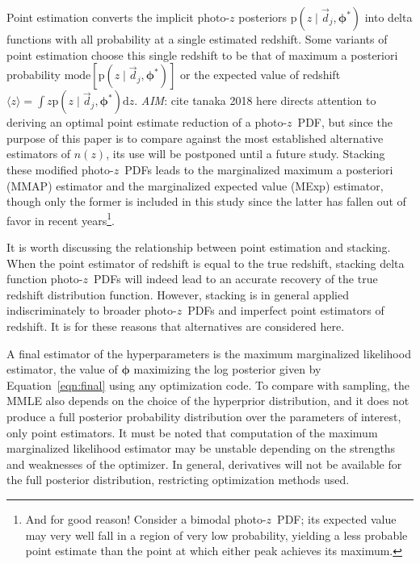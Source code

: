 \documentclass[iop]{emulateapj}
\newcommand{\todo}[3]{{\color{#2}\emph{#1}: #3}}
\newcommand{\aim}[1]{\todo{AIM}{red}{#1}}
\newcommand{\Eq}[1]{Equation~\ref{#1}}
\newcommand{\nz}{$n(z)$}
\newcommand{\data}{\ensuremath{\vec{d}}}
\newcommand{\pr}[1]{\ensuremath{\mathrm{p}(#1)}}
\newcommand{\gvn}{\mid}%
\newcommand{\integral}[2]{\ensuremath{\int #1 \mathrm{d} #2}}
\newcommand{\pz}{photo-$z$~}
\newcommand{\pzpdf}{\pz PDF}
\newcommand{\bvec}[1]{\ensuremath{\boldsymbol{#1}}}
\newcommand{\ndphi}{\bvec{\phi}}
\begin{document}
Point estimation converts the implicit photo-$z$ posteriors $\pr{z \gvn \data_{j}, \ndphi^{*}}$ into delta functions with all probability at a single estimated redshift.  
Some variants of point estimation choose this single redshift to be that of maximum a posteriori probability $\mathrm{mode}[\pr{z \gvn \data_{j}, \ndphi^{*}}]$ or the expected value of redshift $\langle z \rangle = \integral{z \pr{z \gvn \data_{j}, \ndphi^{*}}}{z}$.
\aim{cite tanaka 2018 here} directs attention to deriving an optimal point estimate reduction of a \pzpdf, but since the purpose of this paper is to compare against the most established alternative estimators of \nz, its use will be postponed until a future study.
Stacking these modified \pzpdf s leads to the marginalized maximum a posteriori (MMAP) estimator and the marginalized expected value (MExp) estimator, though only the former is included in this study since the latter has fallen out of favor in recent years\footnote{And for good reason!  Consider a bimodal \pzpdf; its expected value may very well fall in a region of very low probability, yielding a less probable point estimate than the point at which either peak achieves its maximum.}.

It is worth discussing the relationship between point estimation and stacking.  
When the point estimator of redshift is equal to the true redshift, stacking delta function \pzpdf s will indeed lead to an accurate recovery of the true redshift distribution function.  
However, stacking is in general applied indiscriminately to broader \pzpdf s and imperfect point estimators of redshift.  
It is for these reasons that alternatives are considered here.

A final estimator of the hyperparameters is the maximum marginalized likelihood estimator, the value of $\ndphi$ maximizing the log posterior given by \Eq{eqn:final} using any optimization code.  
To compare with sampling, the MMLE also depends on the choice of the hyperprior distribution, and it does not produce a full posterior probability distribution over the parameters of interest, only point estimators.  
It must be noted that computation of the maximum marginalized likelihood estimator may be unstable depending on the strengths and weaknesses of the optimizer.  
In general, derivatives will not be available for the full posterior distribution, restricting optimization methods used.
\end{document}
